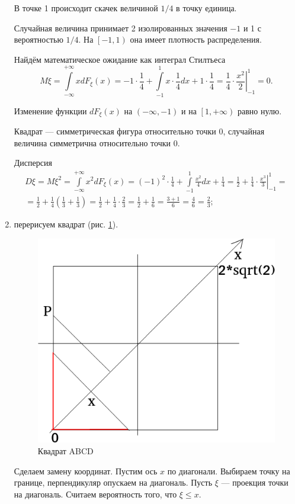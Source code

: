 \begin{enumerate}[label=\alph*)]
В точке 1 происходит скачек величиной $1/4$ в точку единица.

Случайная величина принимает 2 изолированных значения $-1$ и 1 с вероятностью $1/4$.
На $ \left[ -1, 1 \right) $ она имеет плотность распределения.

Найдём математическое ожидание как интеграл Стилтьеса
$$M \xi =
\int \limits_{- \infty }^{+ \infty } xdF_{ \xi } \left( x \right) =
-1 \cdot \frac{1}{4} + \int \limits_{-1}^1 x \cdot \frac{1}{4} dx + 1 \cdot \frac{1}{4} =
\left. \frac{1}{4} \cdot \frac{x^2}{2} \right|_{-1}^1 =
0.$$

Изменение функции $dF_{ \xi } \left( x \right) $ на $ \left( - \infty, -1 \right) $ и на $ \left[ 1, + \infty \right) $ равно нулю.

Квадрат --- симметрическая фигура относительно точки 0, случайная величина симметрична относительно точки 0.

Дисперсия
\begin{equation*}
\begin{split}
D \xi =
M \xi^2 =
\int \limits_{- \infty }^{+ \infty } x^2 dF_{ \xi } \left( x \right) =
\left( -1 \right)^2 \cdot \frac{1}{4} + \int \limits_{-1}^1 \frac{x^2}{4} dx + \frac{1}{4} =
\left. \frac{1}{2} + \frac{1}{4} \cdot \frac{x^3}{3} \right|_{-1}^1 = \\
= \frac{1}{2} + \frac{1}{4} \left( \frac{1}{3} + \frac{1}{3} \right) =
\frac{1}{2} + \frac{1}{4} \cdot \frac{2}{3} =
\frac{1}{2} + \frac{1}{6} =
\frac{3+1}{6} =
\frac{4}{6} =
\frac{2}{3};
\end{split}
\end{equation*}
\item перерисуем квадрат (рис. \ref{fig:1082}).

\begin{figure}[h!]
  \centering
  \includegraphics[width=.4\textwidth]{./pictures/10_8_2.png}
  \caption{Квадрат ABCD}
  \label{fig:1082}
\end{figure}

Сделаем замену координат.
Пустим ось $x$ по диагонали.
Выбираем точку на границе, перпендикуляр опускаем на диагональ.
Пусть $ \xi $ --- проекция точки на диагональ.
Считаем вероятность того, что $ \xi \leq x$.


\end{enumerate}

